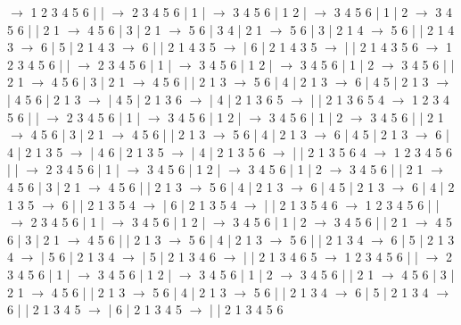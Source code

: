 \documentclass{article}
\begin{document}
\newline
 $\rightarrow$ 1 2 3 4 5 6 |  |  $\rightarrow$ 2 3 4 5 6 | 1 |  $\rightarrow$ 3 4 5 6 | 1 2 |  $\rightarrow$ 3 4 5 6 | 1 | 2 $\rightarrow$ 3 4 5 6 |  | 2 1 $\rightarrow$ 4 5 6 | 3 | 2 1 $\rightarrow$ 5 6 | 3 4 | 2 1 $\rightarrow$ 5 6 | 3 | 2 1 4 $\rightarrow$ 5 6 |  | 2 1 4 3 $\rightarrow$ 6 | 5 | 2 1 4 3 $\rightarrow$ 6 |  | 2 1 4 3 5 $\rightarrow$  | 6 | 2 1 4 3 5 $\rightarrow$  |  | 2 1 4 3 5 6
\newline
 $\rightarrow$ 1 2 3 4 5 6 |  |  $\rightarrow$ 2 3 4 5 6 | 1 |  $\rightarrow$ 3 4 5 6 | 1 2 |  $\rightarrow$ 3 4 5 6 | 1 | 2 $\rightarrow$ 3 4 5 6 |  | 2 1 $\rightarrow$ 4 5 6 | 3 | 2 1 $\rightarrow$ 4 5 6 |  | 2 1 3 $\rightarrow$ 5 6 | 4 | 2 1 3 $\rightarrow$ 6 | 4 5 | 2 1 3 $\rightarrow$  | 4 5 6 | 2 1 3 $\rightarrow$  | 4 5 | 2 1 3 6 $\rightarrow$  | 4 | 2 1 3 6 5 $\rightarrow$  |  | 2 1 3 6 5 4
\newline
 $\rightarrow$ 1 2 3 4 5 6 |  |  $\rightarrow$ 2 3 4 5 6 | 1 |  $\rightarrow$ 3 4 5 6 | 1 2 |  $\rightarrow$ 3 4 5 6 | 1 | 2 $\rightarrow$ 3 4 5 6 |  | 2 1 $\rightarrow$ 4 5 6 | 3 | 2 1 $\rightarrow$ 4 5 6 |  | 2 1 3 $\rightarrow$ 5 6 | 4 | 2 1 3 $\rightarrow$ 6 | 4 5 | 2 1 3 $\rightarrow$ 6 | 4 | 2 1 3 5 $\rightarrow$  | 4 6 | 2 1 3 5 $\rightarrow$  | 4 | 2 1 3 5 6 $\rightarrow$  |  | 2 1 3 5 6 4
\newline
 $\rightarrow$ 1 2 3 4 5 6 |  |  $\rightarrow$ 2 3 4 5 6 | 1 |  $\rightarrow$ 3 4 5 6 | 1 2 |  $\rightarrow$ 3 4 5 6 | 1 | 2 $\rightarrow$ 3 4 5 6 |  | 2 1 $\rightarrow$ 4 5 6 | 3 | 2 1 $\rightarrow$ 4 5 6 |  | 2 1 3 $\rightarrow$ 5 6 | 4 | 2 1 3 $\rightarrow$ 6 | 4 5 | 2 1 3 $\rightarrow$ 6 | 4 | 2 1 3 5 $\rightarrow$ 6 |  | 2 1 3 5 4 $\rightarrow$  | 6 | 2 1 3 5 4 $\rightarrow$  |  | 2 1 3 5 4 6
\newline
 $\rightarrow$ 1 2 3 4 5 6 |  |  $\rightarrow$ 2 3 4 5 6 | 1 |  $\rightarrow$ 3 4 5 6 | 1 2 |  $\rightarrow$ 3 4 5 6 | 1 | 2 $\rightarrow$ 3 4 5 6 |  | 2 1 $\rightarrow$ 4 5 6 | 3 | 2 1 $\rightarrow$ 4 5 6 |  | 2 1 3 $\rightarrow$ 5 6 | 4 | 2 1 3 $\rightarrow$ 5 6 |  | 2 1 3 4 $\rightarrow$ 6 | 5 | 2 1 3 4 $\rightarrow$  | 5 6 | 2 1 3 4 $\rightarrow$  | 5 | 2 1 3 4 6 $\rightarrow$  |  | 2 1 3 4 6 5
\newline
 $\rightarrow$ 1 2 3 4 5 6 |  |  $\rightarrow$ 2 3 4 5 6 | 1 |  $\rightarrow$ 3 4 5 6 | 1 2 |  $\rightarrow$ 3 4 5 6 | 1 | 2 $\rightarrow$ 3 4 5 6 |  | 2 1 $\rightarrow$ 4 5 6 | 3 | 2 1 $\rightarrow$ 4 5 6 |  | 2 1 3 $\rightarrow$ 5 6 | 4 | 2 1 3 $\rightarrow$ 5 6 |  | 2 1 3 4 $\rightarrow$ 6 | 5 | 2 1 3 4 $\rightarrow$ 6 |  | 2 1 3 4 5 $\rightarrow$  | 6 | 2 1 3 4 5 $\rightarrow$  |  | 2 1 3 4 5 6
\end{document}

